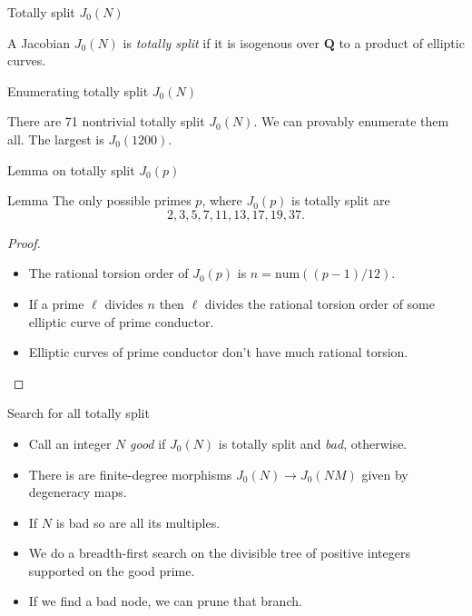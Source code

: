\documentclass{beamer}
\newcommand{\QQ}{\mathbf{Q}}
\newcommand{\num}{\mathrm{num}}
\begin{document}
\begin{frame}{Totally split $J_0(N)$}
    \begin{definition}
        A Jacobian $J_0(N)$ is \emph{totally split} if it is isogenous over
        $\QQ$ to a product of elliptic curves.
    \end{definition}
\end{frame}

\begin{frame}{Enumerating totally split $J_0(N)$}
    \begin{theorem}[L.]
        There are 71 nontrivial totally split $J_0(N)$. We can provably
        enumerate them all. The largest is $J_0(1200)$.
    \end{theorem}
\end{frame}

\begin{frame}{Lemma on totally split $J_0(p)$}
    \begin{block}{Lemma}
    The only possible primes $p$, where $J_0(p)$ is totally split are
    \[
        2, 3, 5, 7, 11, 13, 17, 19, 37.
    \]
    \end{block}
    \begin{proof}
        \begin{itemize}
            \item
                The rational torsion order of $J_0(p)$ is $n=\num((p-1)/12)$.
            \item
                If a prime $\ell$ divides $n$ then $\ell$ divides the rational
                torsion order of some elliptic curve of prime conductor.
            \item
                Elliptic curves of prime conductor don't have much rational
                torsion.
        \end{itemize}
   \end{proof}
\end{frame}

\begin{frame}{Search for all totally split}
    \begin{itemize}
        \item
            Call an integer $N$ \emph{good} if $J_0(N)$ is totally split and
            \emph{bad}, otherwise.
        \item
            There is are finite-degree morphisms $J_0(N)\to J_0(NM)$ given by
            degeneracy maps.
        \item
            If $N$ is bad so are all its multiples.
        \item
            We do a breadth-first search on the divisible tree of positive integers
            supported on the good prime.
        \item
            If we find a bad node, we can prune that branch.
    \end{itemize}
\end{frame}
\end{document}
